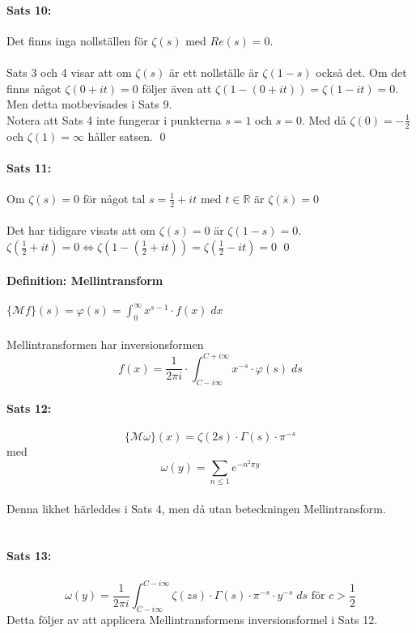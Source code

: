 \documentclass{article}%
\begin{document}
\paragraph{Sats 10:} Det finns inga nollställen för $\zeta(s)$ med $Re(s) = 0.$\\
\\
Sats 3 och 4 visar att om $\zeta(s)$ är ett nollställe är $\zeta(1 - s)$ också det.
Om det finns något $\zeta(0 + it) = 0$ följer även att $\zeta(1 - (0 + it)) = \zeta(1 - it) = 0$. Men detta 
motbevisades i Sats 9.\\
Notera att Sats 4 inte fungerar i punkterna $s = 1$ och $s = 0$. Med då $\zeta(0) = -\frac 1 2$ och 
$\zeta(1) = \infty$ håller satsen.
\hfill \qed

\paragraph{Sats 11:} Om $\zeta(s) = 0$ för något tal $s = \frac 1 2 + it$ med $t \in \mathbb{R}$ är $\zeta(\overline{s}) = 0$ \\
\\
Det har tidigare visats att om $\zeta(s) = 0$ är $\zeta(1 - s) = 0$. $\zeta(\frac 1 2 + it) = 0 \Leftrightarrow 
\zeta(1 - (\frac 1 2 + it)) = \zeta(\frac 1 2 - it) = 0$
\hfill \qed

\paragraph{Definition: Mellintransform} $\{\mathcal{M}f\}(s) = \varphi(s) = \int_0^\infty x^{s - 1} \cdot f(x) \; dx $ \\
\\
Mellintransformen har inversionsformen
\[
	f(x) = \frac {1} {2 \pi i} \cdot \int_{C - i \infty}^{C + i \infty} x^{-s} \cdot \varphi(s) \; ds
\]

\paragraph{Sats 12:} 
\[
	\{\mathcal{M} \omega \} (x) = \zeta(2s) \cdot \Gamma(s) \cdot \pi^{-s}
\]
med 
\[
	\omega(y) = \sum\limits_{n \leq 1} e^{-n^2\pi y}
\]
\\ 
Denna likhet härleddes i Sats 4, men då utan beteckningen Mellintransform.\\
\\
\paragraph{Sats 13:} 
\[
	\omega(y) = \frac {1} {2\pi i} \int_{C - i\infty}^{C - i \infty} \zeta(zs) \cdot \Gamma(s) \cdot \pi^{-s} \cdot
		y^{-s} \; ds \text{ för } c > \frac 1 2
\] 
Detta följer av att applicera Mellintransformens inversionsformel i Sats 12.\\
\end{document}
